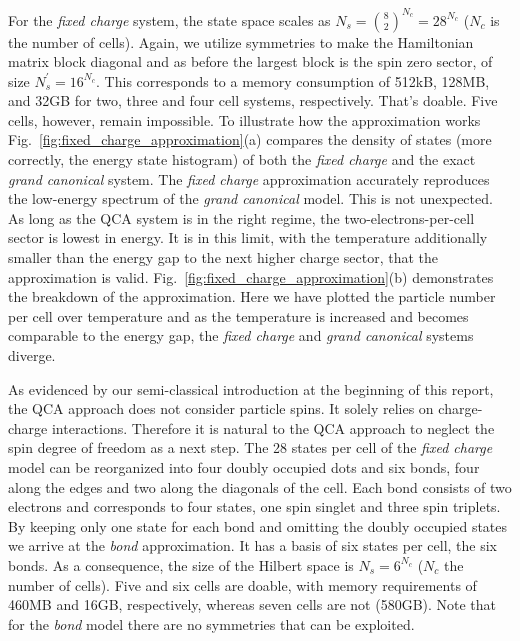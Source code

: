 For the \emph{fixed charge} system, the state space scales as $N_s =
\binom{8}{2}^{N_c} = 28^{N_c}$ ($N_c$ is the number of cells). Again, we utilize
symmetries to make the Hamiltonian matrix block diagonal and as before the
largest block is the spin zero sector, of size $N_s^{\prime} = 16^{N_c}$. This
corresponds to a memory consumption of 512kB, 128MB, and 32GB for two, three and
four cell systems, respectively. That's doable. Five cells, however, remain
impossible. To illustrate how the approximation works
Fig.~\ref{fig:fixed_charge_approximation}(a) compares the density of states
(more correctly, the energy state histogram) of both the \emph{fixed charge}
and the exact \emph{grand canonical} system. The \emph{fixed charge}
approximation accurately reproduces the low-energy spectrum of the \emph{grand
canonical} model. This is not unexpected. As long as the QCA system is in the
right regime, the two-electrons-per-cell sector is lowest in energy. It is in
this limit, with the temperature additionally smaller than the energy gap to the
next higher charge sector, that the approximation is valid.
Fig.~\ref{fig:fixed_charge_approximation}(b) demonstrates the breakdown of the
approximation. Here we have plotted the particle number per cell over
temperature and as the temperature is increased and becomes comparable to the
energy gap, the \emph{fixed charge} and \emph{grand canonical} systems diverge.

As evidenced by our semi-classical introduction at the beginning of this report,
the QCA approach does not consider particle spins. It solely relies on
charge-charge interactions. Therefore it is natural to the QCA approach to
neglect the spin degree of freedom as a next step. The 28 states per cell of the
\emph{fixed charge} model can be reorganized into four doubly occupied dots and
six bonds, four along the edges and two along the diagonals of the cell. Each
bond consists of two electrons and corresponds to four states, one spin singlet
and three spin triplets. By keeping only one state for each bond and omitting
the doubly occupied states we arrive at the \emph{bond} approximation. It has a
basis of six states per cell, the six bonds. As a consequence, the size of the
Hilbert space is $N_s = 6^{N_c}$ ($N_c$ the number of cells). Five and six cells
are doable, with memory requirements of 460MB and 16GB, respectively, whereas
seven cells are not (580GB). Note that for the \emph{bond} model there are no
symmetries that can be exploited. 

